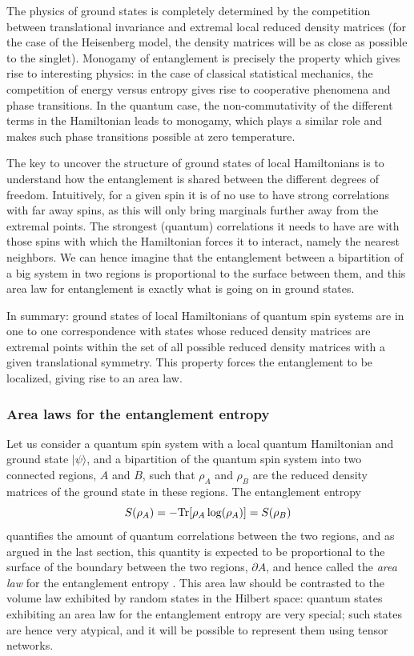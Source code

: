 \documentclass[rmp,aps,reprint,superscriptaddress,nobalancelastpage]{revtex4-1}
\newcommand{\be}{\begin{equation}}
\newcommand{\ee}{\end{equation}}
\begin{document}
The physics of ground states is  completely determined by the competition between translational invariance and extremal local reduced density matrices (for the case of the Heisenberg model, the density matrices will be as close as possible to the singlet).  Monogamy of entanglement is precisely the property which gives rise to interesting physics: in the case of classical statistical mechanics, the competition of energy versus entropy gives rise to cooperative phenomena and phase transitions. In the quantum case, the non-commutativity of the different terms in the Hamiltonian leads to monogamy, which plays a similar role and makes such phase transitions possible at zero temperature.


The key to uncover the structure of ground states of local Hamiltonians is to understand how the entanglement is shared between the different degrees of freedom. Intuitively, for a given spin
it is of no use to have strong correlations with far away spins, as this will only bring marginals further away from the extremal points. The strongest (quantum) correlations it needs to have are with those spins with which the Hamiltonian forces it to interact, namely the nearest neighbors. We can hence imagine that the entanglement between a bipartition of a big system in two regions is proportional to the surface between them, and this area law for entanglement is exactly what is going on in ground states.

In summary: ground states of local Hamiltonians of quantum spin systems are in one to one correspondence with states whose reduced density matrices are extremal points within the set of all possible reduced density matrices with a given translational symmetry. This property forces the entanglement to be localized, giving rise to an area law.

\subsubsection{Area laws for the entanglement entropy}\label{sec2arealaws}

Let us consider a quantum spin system with a local quantum Hamiltonian and ground state $|\psi\rangle$, and a bipartition of the quantum spin system  into two connected regions, $A$ and $B$, such that  $\rho_A$ and $\rho_B$ are the reduced density matrices of the ground state in these regions. The entanglement entropy \cite{bennett1996concentrating}
\be
    S(\rho_A)=-{\rm Tr}[\rho_A\log(\rho_A)]=S(\rho_B)
\ee
quantifies the amount of quantum correlations between the two regions, and as argued in the last section, this quantity is expected to be proportional to the surface of the boundary between the two regions, $\partial A$, and hence called the \emph{area law} for the entanglement entropy \cite{eisert:arealaw-review}. This area law should be contrasted to the volume law exhibited by random states in the Hilbert space: quantum states exhibiting an area law for the entanglement entropy are very special; such states are hence very atypical, and it will  be possible to represent them using tensor networks.
\end{document}
